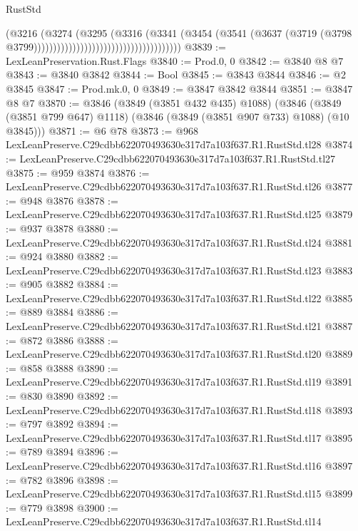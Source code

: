 \begin{lexlean}{RustStd}
\begin{coremodule}
                                                            (@3216
                                                              (@3274
                                                                (@3295
                                                                  (@3316
                                                                    (@3341
                                                                      (@3454
                                                                        (@3541
                                                                          (@3637
                                                                            (@3719
                                                                              (@3798
                                                                                @3799))))))))))))))))))))))))))))))))))))))
@3839 := LexLeanPreservation.Rust.Flags
@3840 := Prod.{0, 0}
@3842 := @3840 @8 @7
@3843 := @3840 @3842
@3844 := Bool
@3845 := @3843 @3844
@3846 := @2 @3845
@3847 := Prod.mk.{0, 0}
@3849 := @3847 @3842 @3844
@3851 := @3847 @8 @7
@3870 := @3846
    (@3849 (@3851 @432 @435) @1088)
    (@3846 (@3849 (@3851 @799 @647) @1118) (@3846 (@3849 (@3851 @907 @733) @1088) (@10 @3845)))
@3871 := @6 @78
@3873 := @968 LexLeanPreserve.C29cdbb622070493630e317d7a103f637.R1.RustStd.tl28
@3874 := LexLeanPreserve.C29cdbb622070493630e317d7a103f637.R1.RustStd.tl27
@3875 := @959 @3874
@3876 := LexLeanPreserve.C29cdbb622070493630e317d7a103f637.R1.RustStd.tl26
@3877 := @948 @3876
@3878 := LexLeanPreserve.C29cdbb622070493630e317d7a103f637.R1.RustStd.tl25
@3879 := @937 @3878
@3880 := LexLeanPreserve.C29cdbb622070493630e317d7a103f637.R1.RustStd.tl24
@3881 := @924 @3880
@3882 := LexLeanPreserve.C29cdbb622070493630e317d7a103f637.R1.RustStd.tl23
@3883 := @905 @3882
@3884 := LexLeanPreserve.C29cdbb622070493630e317d7a103f637.R1.RustStd.tl22
@3885 := @889 @3884
@3886 := LexLeanPreserve.C29cdbb622070493630e317d7a103f637.R1.RustStd.tl21
@3887 := @872 @3886
@3888 := LexLeanPreserve.C29cdbb622070493630e317d7a103f637.R1.RustStd.tl20
@3889 := @858 @3888
@3890 := LexLeanPreserve.C29cdbb622070493630e317d7a103f637.R1.RustStd.tl19
@3891 := @830 @3890
@3892 := LexLeanPreserve.C29cdbb622070493630e317d7a103f637.R1.RustStd.tl18
@3893 := @797 @3892
@3894 := LexLeanPreserve.C29cdbb622070493630e317d7a103f637.R1.RustStd.tl17
@3895 := @789 @3894
@3896 := LexLeanPreserve.C29cdbb622070493630e317d7a103f637.R1.RustStd.tl16
@3897 := @782 @3896
@3898 := LexLeanPreserve.C29cdbb622070493630e317d7a103f637.R1.RustStd.tl15
@3899 := @779 @3898
@3900 := LexLeanPreserve.C29cdbb622070493630e317d7a103f637.R1.RustStd.tl14

\end{coremodule}
\end{lexlean}
